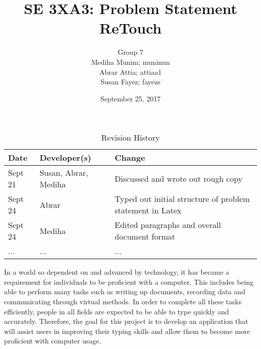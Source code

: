 \documentclass[12pt, oneside]{article}
\title{SE 3XA3: Problem Statement\\ReTouch}
\author{Group 7
		\\ Mediha Munim; munimm
		\\ Abrar Attia; attiaa1
		\\ Susan Fayez; fayezs}
\date{September 25, 2017}
\begin{document}
\begin{table}[hp]
\caption{Revision History} \label{TblRevisionHistory}
\begin{tabularx}{\textwidth}{llX}
\toprule
\textbf{Date} & \textbf{Developer(s)} & \textbf{Change}\\
\midrule
Sept 21 & Susan, Abrar, Mediha & Discussed and wrote out rough copy\\
Sept 24 & Abrar & Typed out initial structure of problem statement in Latex\\
Sept 24 & Mediha & Edited paragraphs and overall document format \\
... & ... & ...\\
\bottomrule
\end{tabularx}
\end{table}

\newpage
\maketitle



In a world so dependent on and advanced by technology, it has became a requirement for individuals to be proficient with a computer. This includes being able to perform many tasks such as writing up documents, recording data and communicating through virtual methods. In order to complete all these tasks efficiently, people in all fields are expected to be able to type quickly and accurately. Therefore, the goal for this project is to develop an application that will assist users in improving their typing skills and allow them to become more proficient with computer usage. 
\\
\end{document}
